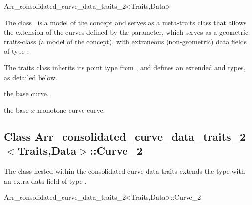 
\ccRefPageBegin
\begin{ccRefClass}{Arr_consolidated_curve_data_traits_2<Traits,Data>}

\ccDefinition

The class \ccRefName\ is a model of the  concept
and serves as a meta-traits class that allows the extension of the curves
defined by the  parameter, which serves as a geometric
traits-class (a model of the  concept), with
extraneous (non-geometric) data fields of type .

The traits class inherits its point type from ,
and defines an extended  and  types,
as detailed below.

 
\ccIsModel

\ccInheritsFrom

\ccTypes

    {the base curve.}

    {the base $x$-monotone curve curve.}

\subsection*{Class 
 Arr\_consolidated\_curve\_data\_traits\_2$<$Traits,Data$>$::Curve\_2}

The  class nested within the consolidated curve-data traits
extends the  type with an extra data field of type
.

\begin{ccClass}{Arr_consolidated_curve_data_traits_2<Traits,Data>::Curve_2}

\ccInheritsFrom

\ccCreation
{}


\end{ccClass}
\end{ccRefClass}

